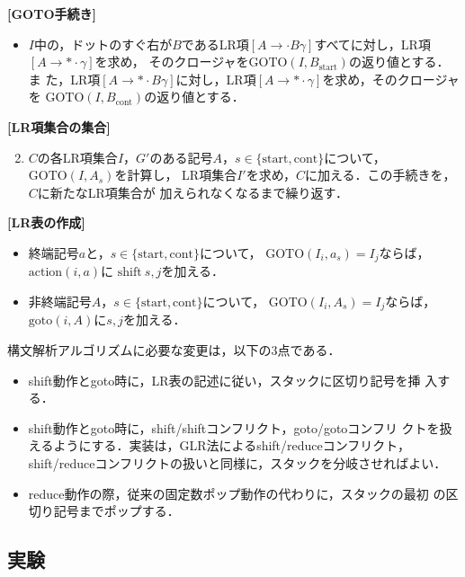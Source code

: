 {\flushleft \bf [GOTO手続き]}
\begin{itemize}
\item $I$中の，ドットのすぐ右が$B$であるLR項$[ A \rightarrow \cdot B
  \gamma]$すべてに対し，LR項$[ A \rightarrow * \cdot \gamma]$を求め，
  そのクロージャを$\mbox{GOTO}(I,B_{\mbox{start}})$の返り値とする．ま
  た，LR項$[ A \rightarrow * \cdot B \gamma]$に対し，LR項$[ A
  \rightarrow * \cdot \gamma ]$を求め，そのクロージャを
  $\mbox{GOTO}(I,B_{\mbox{cont}})$の返り値とする．
\end{itemize}

{\flushleft \bf [LR項集合の集合]}
\begin{enumerate}
\setcounter{enumi}{1}
\item $C$の各LR項集合$I$，$G'$のある記号$A$，$s \in
  \{\mbox{start},\mbox{cont} \}$について，$\mbox{GOTO}(I,A_s)$を計算し，
  LR項集合$I'$を求め，$C$に加える．この手続きを，$C$に新たなLR項集合が
  加えられなくなるまで繰り返す．
\end{enumerate}

{\flushleft \bf [LR表の作成]}
\begin{itemize}
\item 終端記号$a$と，$s \in \{\mbox{start},\mbox{cont} \}$について，
  $\mbox{GOTO}(I_i, a_s) = I_j$ならば，$\mbox{action}(i,a)$に
  $\mbox{shift} ~s,j$を加える．
  
\item 非終端記号$A$，$s \in \{\mbox{start},\mbox{cont} \}$について，
  $\mbox{GOTO}(I_i, A_s) = I_j$ならば，$\mbox{goto}(i,A)$に$s,j$を加える．
\end{itemize}

構文解析アルゴリズムに必要な変更は，以下の3点である．
\begin{itemize}
\item shift動作とgoto時に，LR表の記述に従い，スタックに区切り記号を挿
  入する．
  
\item shift動作とgoto時に，shift/shiftコンフリクト，goto/gotoコンフリ
  クトを扱えるようにする．実装は，GLR法によるshift/reduceコンフリクト，
  shift/reduceコンフリクトの扱いと同様に，スタックを分岐させればよい．
  
\item reduce動作の際，従来の固定数ポップ動作の代わりに，スタックの最初
  の区切り記号までポップする．
\end{itemize}

\subsection{実験}

